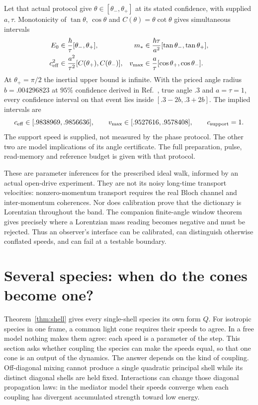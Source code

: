 \documentclass[12pt]{article}
\theoremstyle{definition}
\theoremstyle{remark}
\begin{document}
Let that actual protocol give $\theta\in[\theta_-,\theta_+]$ at its stated confidence, with supplied $a,\tau$. Monotonicity of $\tan\theta$, $\cos\theta$ and $C(\theta)=\theta\cot\theta$ gives simultaneous intervals
\begin{align*}
 E_0&\in\frac{\hbar}{\tau}[\theta_-,\theta_+],&
 m_*&\in\frac{\hbar\tau}{a^2}[\tan\theta_-,\tan\theta_+],\\
 c_{\rm eff}^2&\in\frac{a^2}{\tau^2}[C(\theta_+),C(\theta_-)],&
 v_{\max}&\in\frac a\tau[\cos\theta_+,\cos\theta_-].
\end{align*}
At $\theta_+=\pi/2$ the inertial upper bound is infinite. With the priced angle radius $b=.004296823$ at $95\%$ confidence derived in Ref.~\cite{Liu2026QRAIF_ME}, true angle $.3$ and $a=\tau=1$, every confidence interval on that event lies inside $[.3-2b,.3+2b]$. The implied intervals are
\[
 c_{\rm eff}\in[.9838969,.9856636],\qquad
 v_{\max}\in[.9527616,.9578408],\qquad c_{\rm support}=1 .
\]
The support speed is supplied, not measured by the phase protocol. The other two are model implications of its angle certificate. The full preparation, pulse, read-memory and reference budget is given with that protocol.

These are parameter inferences for the prescribed ideal walk, informed by an actual open-drive experiment. They are not its noisy long-time transport velocities: nonzero-momentum transport requires the real Bloch channel and inter-momentum coherences. Nor does calibration prove that the dictionary is Lorentzian throughout the band. The companion finite-angle window theorem gives precisely where a Lorentzian mass reading becomes negative and must be rejected. Thus an observer's interface can be calibrated, can distinguish otherwise conflated speeds, and can fail at a testable boundary.

\section{Several species: when do the cones become one?}
\label{sec:species}

Theorem~\ref{thm:shell} gives every single-shell species its own form $Q$. For isotropic species in one frame, a common light cone requires their speeds to agree. In a free model nothing makes them agree: each speed is a parameter of the step. This section asks whether coupling the species can make the speeds equal, so that one cone is an output of the dynamics. The answer depends on the kind of coupling. Off-diagonal mixing cannot produce a single quadratic principal shell while its distinct diagonal shells are held fixed. Interactions can change those diagonal propagation laws: in the mediator model their speeds converge when each coupling has divergent accumulated strength toward low energy.
\end{document}
